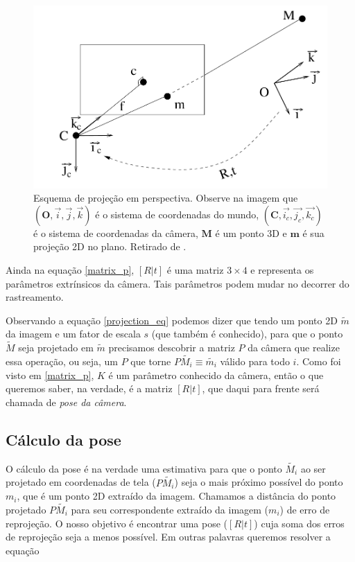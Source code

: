 \begin{figure}[!ht]
\centering\includegraphics[width=5in]{monografia/projection_scheme.png}
\caption{Esquema de projeção em perspectiva. Observe na imagem que $(\mathbf{O}, \vec{i}, \vec{j}, \vec{k})$ é o sistema de coordenadas do mundo, $(\mathbf{C}, \vec{i_c}, \vec{j_c}, \vec{k_c})$ é o sistema de coordenadas da câmera, $\mathbf{M}$ é um ponto 3D e $\mathbf{m}$ é sua projeção 2D no plano. Retirado de \cite{lepetit}.}
\label{projection_scheme}
\end{figure}

Ainda na equação \eqref{matrix_p}, $[R | t]$ é uma matriz $3 \times 4$ e representa os parâmetros extrínsicos da câmera. Tais parâmetros podem mudar no decorrer do rastreamento.

Observando a equação \eqref{projection_eq} podemos dizer que tendo um ponto 2D $\tilde{m}$ da imagem e um fator de escala $s$ (que também é conhecido), para que o ponto $\tilde{M}$ seja projetado em $\tilde{m}$ precisamos descobrir a matriz $P$ da câmera que realize essa operação, ou seja, um $P$ que torne $P\tilde{M_i} \equiv \tilde{m_i}$ válido para todo $i$. Como foi visto em \eqref{matrix_p}, $K$ é um parâmetro conhecido da câmera, então o que queremos saber, na verdade, é a matriz $[R | t]$, que daqui para frente será chamada de \emph{pose da câmera}.

\subsection{Cálculo da pose}

O cálculo da pose é na verdade uma estimativa para que o ponto $\tilde{M_i}$ ao ser projetado em coordenadas de tela ($P\tilde{M_i}$) seja o mais próximo possível do ponto $m_i$, que é um ponto 2D extraído da imagem. Chamamos a distância do ponto projetado $P\tilde{M_i}$ para seu correspondente extraído da imagem ($m_i$) de erro de reprojeção. O nosso objetivo é encontrar uma pose ($[R | t]$) cuja soma dos erros de reprojeção seja a menos possível. Em outras palavras queremos resolver a equação

